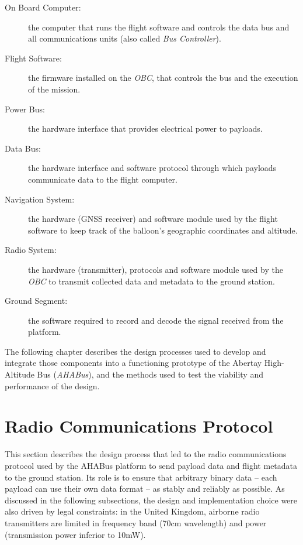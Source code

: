 \begin{description}
    
\item[On Board Computer:] the computer that runs the flight software and
controls the data bus and all communications units (also called
\textit{Bus Controller}).

\item[Flight Software:] the firmware installed on the \textit{OBC}, that
controls the bus and the execution of the mission.

\item[Power Bus:] the hardware interface that provides electrical power to
payloads.

\item[Data Bus:] the hardware interface and software protocol through which
payloads communicate data to the flight computer.

\item[Navigation System:] the hardware (GNSS receiver) and software module used
by the flight software to keep track of the balloon's geographic coordinates and
altitude.

\item[Radio System:] the hardware (transmitter), protocols and software module
used by the \textit{OBC} to transmit collected data and metadata to the
ground station.

\item[Ground Segment:] the software required to record and decode the signal
received from the platform.
    
\end{description}

The following chapter describes the design processes used to develop and
integrate those components into a functioning prototype of the Abertay
High-Altitude Bus (\textit{AHABus}), and the methods used to test the viability
and performance of the design.

\section{Radio Communications Protocol}

This section describes the design process that led to the radio communications
protocol used by the AHABus platform to send payload data and flight metadata
to the ground station. Its role is to ensure that arbitrary binary data – each
payload can use their own data format – as stably and reliably as possible. As
discussed in the following subsections, the design and implementation choice
were also driven by legal constraints: in the United Kingdom, airborne radio
transmitters are limited in frequency band (70cm wavelength) and power
(transmission power inferior to 10mW).

